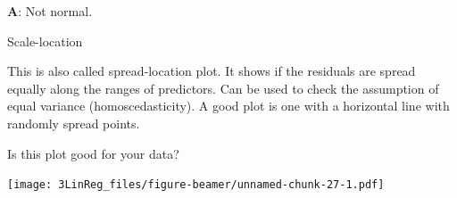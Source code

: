 \documentclass[10pt,ignorenonframetext,]{beamer}
\newenvironment{Shaded}{\begin{snugshade}}{\end{snugshade}}
\newcommand{\KeywordTok}[1]{\textcolor[rgb]{0.13,0.29,0.53}{\textbf{#1}}}
\newcommand{\DataTypeTok}[1]{\textcolor[rgb]{0.13,0.29,0.53}{#1}}
\newcommand{\FloatTok}[1]{\textcolor[rgb]{0.00,0.00,0.81}{#1}}
\newcommand{\StringTok}[1]{\textcolor[rgb]{0.31,0.60,0.02}{#1}}
\newcommand{\OtherTok}[1]{\textcolor[rgb]{0.56,0.35,0.01}{#1}}
\newcommand{\OperatorTok}[1]{\textcolor[rgb]{0.81,0.36,0.00}{\textbf{#1}}}
\newcommand{\NormalTok}[1]{#1}
\begin{document}
\begin{frame}

\textbf{A}: Not normal.

\end{frame}

\begin{frame}

\begin{block}{Scale-location}

This is also called spread-location plot. It shows if the residuals are
spread equally along the ranges of predictors. Can be used to check the
assumption of equal variance (homoscedasticity). A good plot is one with
a horizontal line with randomly spread points.

Is this plot good for your data?

\end{block}

\end{frame}

\begin{frame}[fragile]

\footnotesize

\begin{Shaded}
\end{Shaded}

\texttt{[image: 3LinReg\_files/figure-beamer/unnamed-chunk-27-1.pdf]}
\normalsize

\end{frame}
\end{document}
